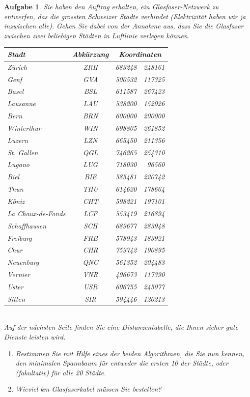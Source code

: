 \documentclass[12pt,a4paper]{report}
\theoremstyle{break}
\newtheorem{exercise}{Aufgabe}[section]
\theoremstyle{plain}
\begin{document}
\begin{exercise}
Sie haben den Auftrag erhalten, ein Glasfaser-Netzwerk zu entwerfen,
das die gr\"{o}ssten Schweizer St\"{a}dte verbindet
(Elektrizit\"{a}t haben wir ja inzwischen alle). Gehen Sie dabei von
der Annahme aus, dass Sie die Glasfaser zwischen zwei beliebigen St\"{a}dten in
Luftlinie verlegen k\"{o}nnen.\\

\begin{tabular}{|l|c|r@{ / }r|}\hline
  Stadt & Abk\"{u}rzung & \multicolumn{2}{c|}{Koordinaten} \\
  \hline
  Z\"{u}rich & ZRH & 683248 & 248161 \\
  Genf &         GVA & 500532 & 117325 \\
  Basel &        BSL & 611587 & 267423 \\
  Lausanne & LAU & 538200 & 152026 \\
  Bern &         BRN & 600000 & 200000 \\
  Winterthur & WIN & 698805 & 261852 \\
  Luzern &     LZN & 665450 &  211356 \\
  St. Gallen & QGL & 746265 & 254310 \\
  Lugano &    LUG & 718030 & 96560 \\
  Biel &          BIE  & 585481 & 220742 \\
  \hline
  Thun &       THU & 614620 & 178664 \\
  K\"{o}niz & CHT & 598221 & 197101 \\
  La Chaux-de-Fonds & LCF & 553419 & 216894 \\
  Schaffhausen & SCH & 689677 & 283948 \\
  Freiburg & FRB & 578943 & 183921 \\
  Chur & CHR & 759742 & 190895 \\
  Neuenburg & QNC & 561352 & 204483 \\
  Vernier & VNR & 496673 & 117390 \\
  Uster & USR & 696755 & 245077 \\
  Sitten & SIR & 594446 & 120213 \\
  \hline
\end{tabular}\\

Auf der n\"achsten Seite finden Sie eine Distanzentabelle, die Ihnen
sicher gute Dienste leisten wird. 

\begin{enumerate}
\item Bestimmen Sie mit Hilfe eines der
beiden Algorithmen, die Sie nun kennen, den minimalen Spannbaum
f\"{u}r entweder die ersten 10 der St\"{a}dte, oder (fakultativ)
f\"{u}r alle 20 St\"{a}dte.
\item Wieviel km Glasfaserkabel m\"{u}ssen Sie bestellen?
\end{enumerate}

\end{exercise}
\end{document}
